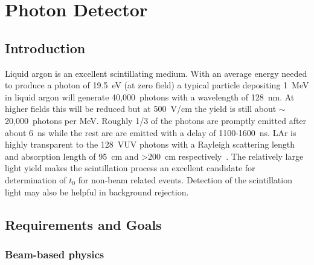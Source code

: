 \chapter{Photon Detector}
\label{ch:photon}
\section{Introduction}



Liquid argon is an excellent scintillating medium. With an average
energy needed to produce a photon of 19.5~eV (at zero field) a typical
particle depositing 1~MeV in liquid argon will generate 40,000~photons
with a wavelength of 128~nm. At higher fields this will be reduced but
at 500~V/cm the yield is still about $\sim$20,000~photons per
MeV. Roughly 1/3 of the photons are promptly emitted after about 6~ns
while the rest are are emitted with a delay of 1100-1600~ns. LAr
is highly transparent to the 128~VUV photons with a Rayleigh
scattering length and absorption length of 95~cm and >200~cm
respectively~\cite{bib:gracearxiv}. The relatively large light yield makes the scintillation
process an excellent candidate for determination of $t_{0}$ for
non-beam related events. Detection of the scintillation light may also
be helpful in background rejection.

\section{Requirements and Goals}

\subsection{Beam-based physics}

